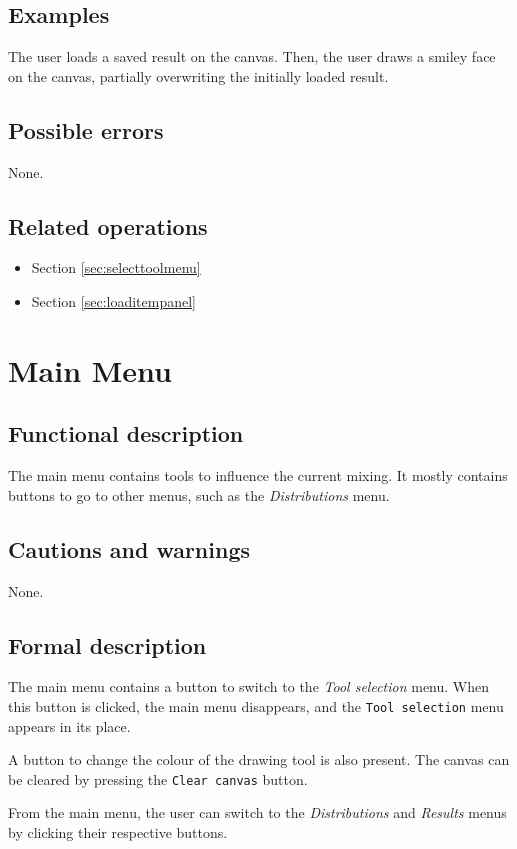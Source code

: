   \subsection*{Examples}
  The user loads a saved result on the canvas. Then, the user draws a smiley face on the canvas, partially overwriting the initially loaded result.

  \subsection*{Possible errors}
  None.

  \subsection*{Related operations}
  \begin{itemize}
    \item Section \ref{sec:selecttoolmenu}
    \item Section \ref{sec:loaditempanel}
  \end{itemize}  

\section{Main Menu}\label{sec:mainmenu}
  \subsection*{Functional description}
  The main menu contains tools to influence the current mixing. It mostly contains buttons to go to other menus, such as the \emph{Distributions} menu.

  \subsection*{Cautions and warnings}
  None.

  \subsection*{Formal description}
  The main menu contains a button to switch to the \emph{Tool selection} menu. When this button is clicked, the main menu disappears, and the \texttt{Tool selection} menu appears in its place.
  
  A button to change the colour of the drawing tool is also present. The canvas can be cleared by pressing the \texttt{Clear canvas} button.
  
  From the main menu, the user can switch to the \emph{Distributions} and \emph{Results} menus by clicking their respective buttons.
  
